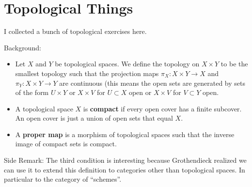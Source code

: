 \documentclass[a4paper,10pt]{article}
\begin{document}
\newpage
\section{Topological Things}
I collected a bunch of topological exercises here. 

	Background: 
\begin{itemize}
	\item Let $X$ and $Y$ be topological spaces. We define the topology on $X\times Y$ to be the smallest topology such that the projection maps $\pi_X: X \times Y \to X$ and $\pi_Y: X\times Y \to Y$ are continuous (this means the open sets are generated by sets of the form $U \times Y$ or $X\times V$ for $U\subset X$ open or $X \times V$ for $V\subset Y$ open. 
	\item A topological space $X$ is \textbf{compact} if every open cover has a finite subcover. An open cover is just a union of open sets that equal $X$.
	\item A \textbf{proper map} is a morphism of topological spaces such that the inverse image of compact sets is compact. 
\end{itemize}

Side Remark: The third condition is interesting because Grothendieck realized we can use it to extend this definition to categories other than topological spaces. In particular to the category of ``schemes''.
\end{document}
